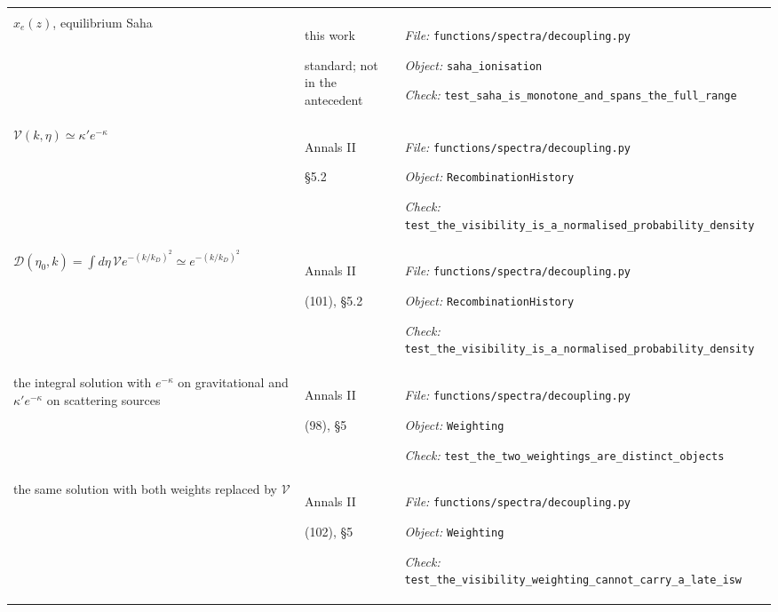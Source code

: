 \begin{landscape}
\begin{longtable}{@{}>{\raggedright\arraybackslash}p{80mm}
                     >{\raggedright\arraybackslash}p{38mm}
                     >{\raggedright\arraybackslash}p{99mm}@{}}
{\textit{Object:} \nolinkurl{integrate_wilson}\par
\textit{Check:} \nolinkurl{test_wilson_reproduces_the_bundle_and_tests_the_phase_convention}} \\
\addlinespace[2pt]
$x_e(z)$, equilibrium Saha & this work\par standard; not in the antecedent & {\scriptsize \textit{File:} \nolinkurl{functions/spectra/decoupling.py}\par
\textit{Object:} \nolinkurl{saha_ionisation}\par
\textit{Check:} \nolinkurl{test_saha_is_monotone_and_spans_the_full_range}} \\
\addlinespace[2pt]
$\mathcal V(k,\eta)\simeq\kappa' e^{-\kappa}$ & Annals II\par \S5.2 & {\scriptsize \textit{File:} \nolinkurl{functions/spectra/decoupling.py}\par
\textit{Object:} \nolinkurl{RecombinationHistory}\par
\textit{Check:} \nolinkurl{test_the_visibility_is_a_normalised_probability_density}} \\
\addlinespace[2pt]
$\mathcal D(\eta_0,k)=\int d\eta\,\mathcal V e^{-(k/k_D)^2}\simeq e^{-(k/k_D)^2}$ & Annals II\par (101), \S5.2 & {\scriptsize \textit{File:} \nolinkurl{functions/spectra/decoupling.py}\par
\textit{Object:} \nolinkurl{RecombinationHistory}\par
\textit{Check:} \nolinkurl{test_the_visibility_is_a_normalised_probability_density}} \\
\addlinespace[2pt]
the integral solution with $e^{-\kappa}$ on gravitational and $\kappa'e^{-\kappa}$ on scattering sources & Annals II\par (98), \S5 & {\scriptsize \textit{File:} \nolinkurl{functions/spectra/decoupling.py}\par
\textit{Object:} \nolinkurl{Weighting}\par
\textit{Check:} \nolinkurl{test_the_two_weightings_are_distinct_objects}} \\
\addlinespace[2pt]
the same solution with both weights replaced by $\mathcal V$ & Annals II\par (102), \S5 & {\scriptsize \textit{File:} \nolinkurl{functions/spectra/decoupling.py}\par
\textit{Object:} \nolinkurl{Weighting}\par
\textit{Check:} \nolinkurl{test_the_visibility_weighting_cannot_carry_a_late_isw}} \\

\end{longtable}
\end{landscape}
